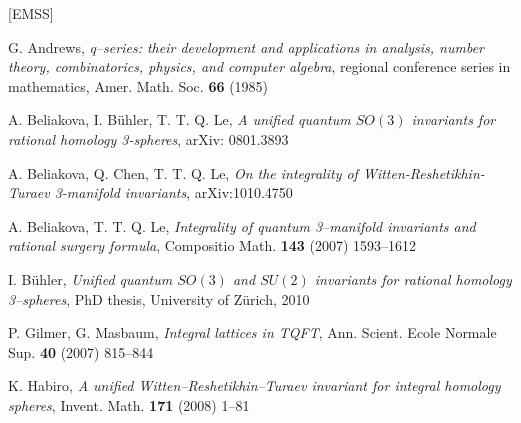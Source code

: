 \documentclass[12pt]{amsart}
\theoremstyle{plain}
\theoremstyle{definition}
\begin{document}
\begin{thebibliography}{[EMSS]}


 G. Andrews, {\em  q--series: their
development and applications in analysis, number theory,
combinatorics, physics, and computer algebra}, regional conference
series in mathematics, Amer. Math. Soc. {\bf 66} (1985)


 A. Beliakova, I. B\"uhler, T. T. Q. Le,
{\em A  unified quantum  $SO(3)$ invariants for rational
 homology 3-spheres}, arXiv: 0801.3893

  A. Beliakova, Q. Chen, T. T. Q. Le,
{\em On the integrality of Witten-Reshetikhin-Turaev 3-manifold invariants}, arXiv:1010.4750


 A. Beliakova, T. T. Q.  Le, {\em Integrality of quantum
3--manifold invariants and rational surgery formula},
{Compositio Math.} {\bf 143} (2007) 1593--1612

 I. B\"uhler, {\em Unified quantum $SO(3)$ and $SU(2)$
invariants for
rational homology 3--spheres},
PhD thesis, University of Z\"urich, 2010





 P. Gilmer, G. Masbaum, {\em Integral lattices in TQFT},
Ann. Scient. Ecole Normale Sup.  {\bf 40}   (2007) 815--844



 K. Habiro,
{\em A unified Witten--Reshetikhin--Turaev invariant for integral homology
spheres}, Invent. Math. {\bf 171}  (2008) 1--81




\end{thebibliography}
\end{document}

